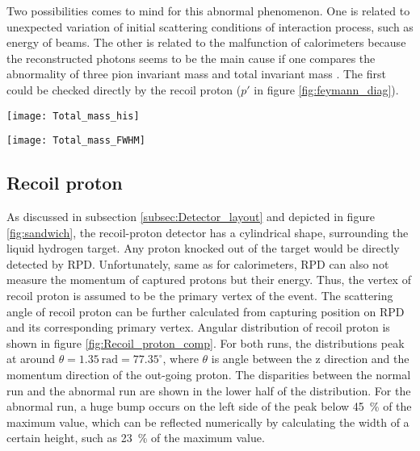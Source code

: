 Two possibilities comes to mind for this abnormal phenomenon. One is related to unexpected variation of initial scattering conditions of interaction process, such as energy of beams. The other is related to the malfunction of calorimeters because the reconstructed photons seems to be the main cause if one compares the abnormality of three pion invariant mass and total invariant mass . The first could be checked directly by the recoil proton ($p'$ in figure \ref{fig:feymann_diag}).

\begin{figure*}[!ht]
	\centering
	\vspace{2cm}
	\texttt{[image: Total\_mass\_his]}
	\caption{Histogram of the total invariant mass distribution. The colors inside the histogram represent the number of events corresponding to the run number and invariant mass. To see the disparities of each run more clearly, the distribution of invariant mass is normalized with maximum value fixed to be 1000. In the red dashed rectangles, it can be seen that the red strokes are much longer than the normal runs.}
	\label{fig:Total_mass_his}
	\vspace{2 cm}
	
	\texttt{[image: Total\_mass\_FWHM]}
	\caption{Value of full width at half maximum of the total invariant distribution for each run. The typical value of FWHM for a normal run is around \SI{1.5}{\giga\electronvolt}.There are several outliners that have much bigger FWHM than the usual ones. Also there is a range of runs 70223 $\sim$ 70240 that have a slightly smaller value of FWHM value. }
	\label{fig:Total_mass_FWHM}
	\vspace{3cm}
\end{figure*}

\subsection{Recoil proton}

\label{subsec:recoil_proton}
As discussed in subsection \ref{subsec:Detector_layout} and depicted in figure \ref{fig:sandwich}, the recoil-proton detector has a cylindrical shape, surrounding the liquid hydrogen target. Any proton knocked out of the target would be directly detected by RPD. Unfortunately, same as for calorimeters, RPD can also not measure the momentum of captured protons but their energy. Thus, the vertex of recoil proton is assumed to be the primary vertex of the event. The scattering angle of recoil proton can be further calculated from capturing position on RPD and its corresponding primary vertex. Angular distribution of recoil proton is shown in figure \ref{fig:Recoil_proton_comp}. For both runs, the distributions peak at around $\theta=\SI{1.35}{\radian} = 77.35^{\circ}$, where $\theta$ is angle between the z direction and the momentum direction of the out-going proton. The disparities between the normal run and the abnormal run are shown in the lower half of the distribution. For the abnormal run, a huge bump occurs on the left side of the peak below \SI{45}{\percent} of the maximum value, which can be reflected numerically by calculating the width of a certain height, such as \SI{23}{\percent} of the maximum value.

